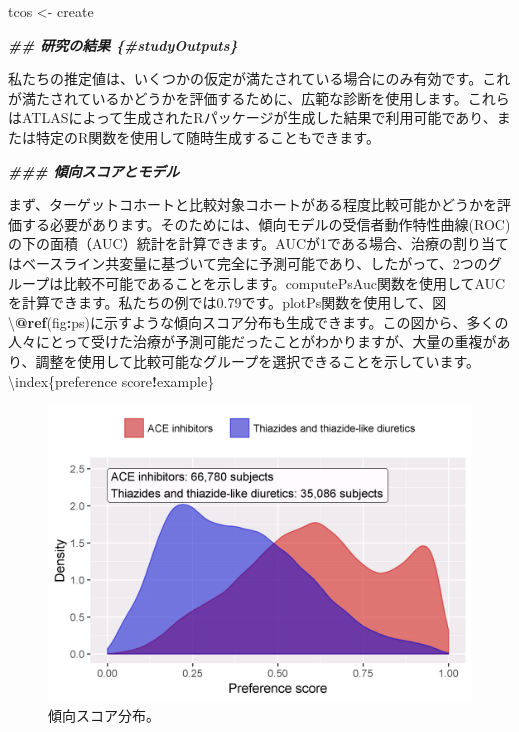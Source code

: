 \documentclass[
  11pt]{book}
\newenvironment{Shaded}{\begin{snugshade}}{\end{snugshade}}
\newcommand{\AttributeTok}[1]{\textcolor[rgb]{0.13,0.29,0.53}{#1}}
\newcommand{\DecValTok}[1]{\textcolor[rgb]{0.00,0.00,0.81}{#1}}
\newcommand{\DocumentationTok}[1]{\textcolor[rgb]{0.56,0.35,0.01}{\textbf{\textit{#1}}}}
\newcommand{\FloatTok}[1]{\textcolor[rgb]{0.00,0.00,0.81}{#1}}
\newcommand{\FunctionTok}[1]{\textcolor[rgb]{0.13,0.29,0.53}{\textbf{#1}}}
\newcommand{\NormalTok}[1]{#1}
\newcommand{\OtherTok}[1]{\textcolor[rgb]{0.56,0.35,0.01}{#1}}
\newcommand{\SpecialCharTok}[1]{\textcolor[rgb]{0.81,0.36,0.00}{\textbf{#1}}}
\newcommand{\StringTok}[1]{\textcolor[rgb]{0.31,0.60,0.02}{#1}}
\theoremstyle{definition}
\theoremstyle{definition}
\theoremstyle{definition}
\theoremstyle{definition}
\theoremstyle{remark}
\begin{document}
\begin{Shaded}
\begin{Highlighting}[]
\NormalTok{tcos }\OtherTok{\textless{}{-}}\NormalTok{ create}

\DocumentationTok{\#\# 研究の結果 \{\#studyOutputs\}}

\NormalTok{私たちの推定値は、いくつかの仮定が満たされている場合にのみ有効です。これが満たされているかどうかを評価するために、広範な診断を使用します。これらはATLASによって生成されたRパッケージが生成した結果で利用可能であり、または特定のR関数を使用して随時生成することもできます。}

\DocumentationTok{\#\#\# 傾向スコアとモデル}

\NormalTok{まず、ターゲットコホートと比較対象コホートがある程度比較可能かどうかを評価する必要があります。そのためには、傾向モデルの受信者動作特性曲線(ROC)の下の面積（AUC）統計を計算できます。AUCが1である場合、治療の割り当てはベースライン共変量に基づいて完全に予測可能であり、したがって、}\DecValTok{2}\NormalTok{つのグループは比較不可能であることを示します。}\StringTok{\textasciigrave{}}\AttributeTok{computePsAuc}\StringTok{\textasciigrave{}}\NormalTok{関数を使用してAUCを計算できます。私たちの例では0}\FloatTok{.79}\NormalTok{です。}\StringTok{\textasciigrave{}}\AttributeTok{plotPs}\StringTok{\textasciigrave{}}\NormalTok{関数を使用して、図 \textbackslash{}}\SpecialCharTok{@}\FunctionTok{ref}\NormalTok{(fig}\SpecialCharTok{:}\NormalTok{ps)に示すような傾向スコア分布も生成できます。この図から、多くの人々にとって受けた治療が予測可能だったことがわかりますが、大量の重複があり、調整を使用して比較可能なグループを選択できることを示しています。 \textbackslash{}index\{preference score}\SpecialCharTok{!}\NormalTok{example\}}
\end{Highlighting}
\end{Shaded}

\begin{figure}

{\centering \includegraphics[width=0.8\linewidth]{images/PopulationLevelEstimation/ps} 

}

\caption{傾向スコア分布。}\label{fig:ps}
\end{figure}
\end{document}
